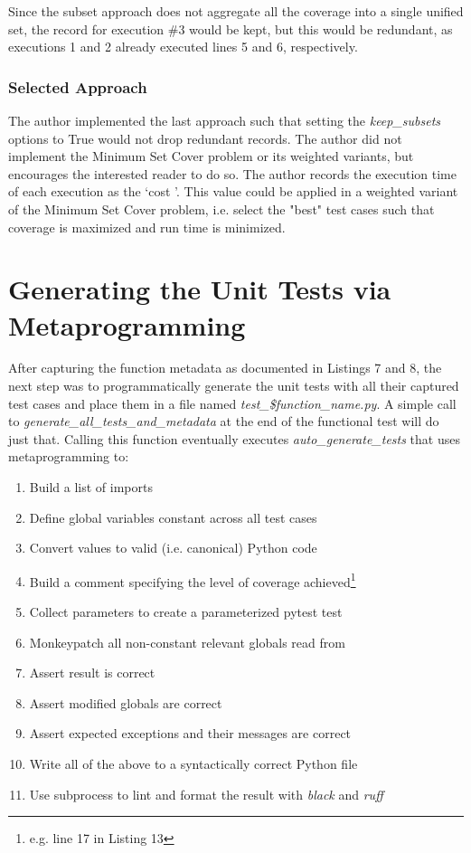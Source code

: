 Since the subset approach does not aggregate all  the coverage into a 
single unified set, the record for execution \#3 would be kept, but this would 
be redundant, as executions 1 and 2 already executed lines 5 and 6, respectively.

\subsubsection{Selected Approach}\label{sec:tuning-2}

The author implemented the last approach such that setting the \textit{keep\_subsets}
options to True would not drop redundant records.  The author did not implement 
the Minimum Set Cover problem or its weighted variants, but encourages 
the interested reader to do so.  The author records the execution time of each 
execution as the \lq cost \rq. This value could be applied in a weighted 
variant of the Minimum Set Cover problem, i.e. select the "best" test cases
such that coverage is maximized and run time is minimized.
   
\section{Generating the Unit Tests via Metaprogramming}\label{sec:generating-tests}

After capturing the function metadata as documented in Listings 7 and 8, 
the next step was to programmatically generate the unit tests with all their 
captured test cases and place them in a file named 
\textit{test\_\$function\_name.py}. 
A simple call to \textit{generate\_all\_tests\_and\_metadata} at the end of 
the functional test will do just that.
 Calling this function eventually executes 
\textit{auto\_generate\_tests} that uses metaprogramming to:
\begin{enumerate}[leftmargin=.1cm]
  \item Build a list of imports
  \item Define global variables constant across all test cases
  \item Convert values to valid (i.e. canonical) Python code
  \item Build a comment specifying the level of coverage achieved\footnote{e.g. line 17 in Listing 13}
  \item Collect parameters to create a parameterized pytest test
  \item Monkeypatch all non-constant relevant globals read from
  \item Assert result is correct
  \item Assert modified globals are correct
  \item Assert expected exceptions and their messages are correct
  \item Write all of the above to a syntactically correct Python file
  \item Use subprocess to lint and format the result with \textit{black} and \textit{ruff}
\end{enumerate}

